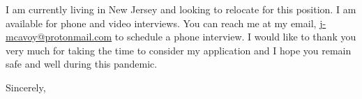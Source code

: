 \documentclass[11pt]{letter} %
\makeatletter
\newcommand{\myemail}{\href{mailto:j-mcavoy@protonmail.com}{j-mcavoy@protonmail.com}}
\makeatother
\begin{document}
\begin{letter}
I am currently living in New Jersey and looking to relocate for this position. I
am available for phone and video interviews. You can reach me at my email,
{\underline \myemail} to schedule a phone interview. I would like to thank you very much for
taking the time to consider my application and I hope you remain safe and well
during this pandemic.

\closing{Sincerely,}



\end{letter}
\end{document}
